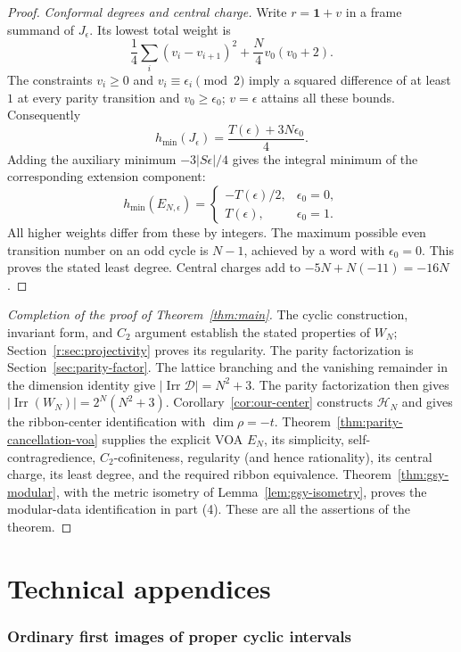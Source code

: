 \documentclass[11pt,a4paper]{article}
\numberwithin{equation}{section}
\theoremstyle{definition}\newtheorem{definition}[theorem]{Definition}
\theoremstyle{remark}\newtheorem{remark}[theorem]{Remark}
\begin{document}
\begin{proof}
\emph{Conformal degrees and central charge.}
Write $r=\mathbf1+v$ in a frame summand of $J_\epsilon$.
Its lowest total weight is
\[
 \frac14\sum_i(v_i-v_{i+1})^2+\frac N4v_0(v_0+2).
\]
The constraints $v_i\geq0$ and $v_i\equiv\epsilon_i\pmod2$
imply a squared difference of at least $1$ at every parity
transition and $v_0\geq\epsilon_0$; $v=\epsilon$ attains all
these bounds. Consequently
\[
 h_{\min}(J_\epsilon)
 =\frac{T(\epsilon)+3N\epsilon_0}{4}.
\]
Adding the auxiliary minimum $-3|S\epsilon|/4$ gives the integral
minimum of the corresponding extension component:
\[
 h_{\min}(E_{N,\epsilon})=
 \begin{cases}
 -T(\epsilon)/2,&\epsilon_0=0,\\
 T(\epsilon),&\epsilon_0=1.
 \end{cases}
\]
All higher weights differ from these by integers. The maximum
possible even transition number on an odd cycle is $N-1$, achieved
by a word with $\epsilon_0=0$.
This proves the stated least degree. Central charges add to
$-5N+N(-11)=-16N$.
\end{proof}

\begin{proof}[Completion of the proof of Theorem~\ref{thm:main}]
The cyclic construction, invariant form, and $C_2$ argument establish
the stated properties of $W_N$; Section~\ref{r:sec:projectivity}
proves its regularity. The parity factorization is
Section~\ref{sec:parity-factor}. The lattice branching and the vanishing
remainder in the dimension identity give
$|\operatorname{Irr}\mathcal D|=N^2+3$. The parity factorization
then gives $|\operatorname{Irr}(W_N)|=2^N(N^2+3)$.
Corollary~\ref{cor:our-center} constructs $\mathcal H_N$ and gives
the ribbon-center identification with $\dim\rho=-t$.
Theorem~\ref{thm:parity-cancellation-voa} supplies the explicit VOA $E_N$, its
simplicity, self-contragredience, $C_2$-cofiniteness, regularity
(and hence rationality), its central charge, its least degree, and
the required ribbon equivalence. Theorem~\ref{thm:gsy-modular}, with the metric
isometry of Lemma~\ref{lem:gsy-isometry}, proves the modular-data
identification in part (4). These are all the assertions of the theorem.
\end{proof}

\appendix
\part*{Technical appendices}
\section{Ordinary first images of proper cyclic intervals}
\label{app:ordinary-interval-images}
\label{neutral:app:proper-intervals}
\end{document}
